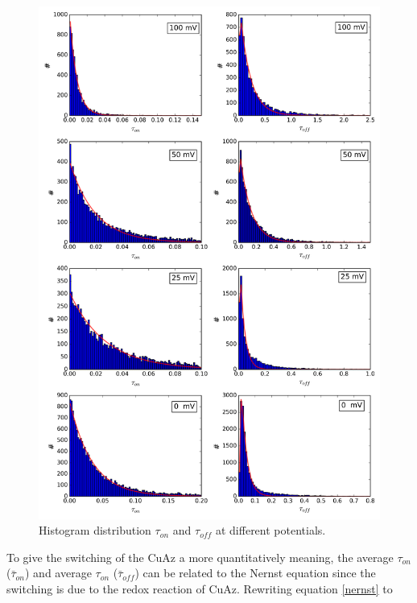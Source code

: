 \documentclass[twoside,single]{lion-msc}
\begin{document}
\begin{figure}[ht!]
\centering
\includegraphics[width=.9\textwidth]{histograms_thesis}
\caption{Histogram distribution $\tau_{on}$ and $\tau_{off}$ at different potentials.}
\label{histograms_disc}
\end{figure}

To give the switching of the CuAz a more quantitatively meaning, the average $\tau_{on}$ ($\bar{\tau}_{on}$) and average $\tau_{on}$ ($\bar{\tau}_{off}$) can be related to the Nernst equation since the switching is due to the redox reaction of CuAz. Rewriting equation \ref{nernst} to 
\end{document}
